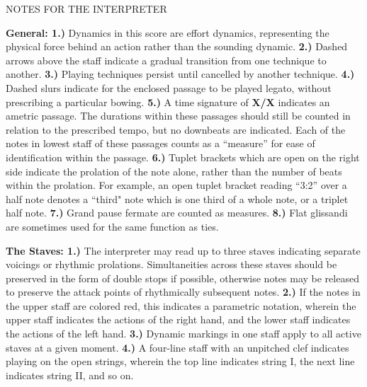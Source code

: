 \documentclass[10pt]{article}
\begin{document}
\begingroup
\begin{center}
\huge NOTES FOR THE INTERPRETER
\end{center}
\endgroup

\begingroup
\begin{center}
\huge 
\end{center}
\endgroup


\begingroup
\textbf{General: 1.)} Dynamics in this score are effort dynamics, representing the physical force behind an action rather than the sounding dynamic. \textbf{2.)} Dashed arrows above the staff indicate a gradual transition from one technique to another. \textbf{3.)} Playing techniques persist until cancelled by another technique. \textbf{4.)} Dashed slurs indicate for the enclosed passage to be played legato, without prescribing a particular bowing. \textbf{5.)} A time signature of \textbf{X/X} indicates an ametric passage. The durations within these passages should still be counted in relation to the prescribed tempo, but no downbeats are indicated. Each of the notes in lowest staff of these passages counts as a ``measure'' for ease of identification within the passage. \textbf{6.)} Tuplet brackets which are open on the right side indicate the prolation of the note alone, rather than the number of beats within the prolation. For example, an open tuplet bracket reading ``3:2'' over a half note denotes a ``third" note which is one third of a whole note, or a triplet half note. \textbf{7.)} Grand pause fermate are counted as measures. \textbf{8.)} Flat glissandi are sometimes used for the same function as ties. \\
\endgroup 

\begingroup
\textbf{The Staves: 1.)} The interpreter may read up to three staves indicating separate voicings or rhythmic prolations. Simultaneities across these staves should be preserved in the form of double stops if possible, otherwise notes may be released to preserve the attack points of rhythmically subsequent notes. \textbf{2.)} If the notes in the upper staff are colored red, this indicates a parametric notation, wherein the upper staff indicates the actions of the right hand, and the lower staff indicates the actions of the left hand. \textbf{3.)} Dynamic markings in one staff apply to all active staves at a given moment.  \textbf{4.)} A four-line staff with an unpitched clef indicates playing on the open strings, wherein the top line indicates string I, the next line indicates string II, and so on. \\
\endgroup
\end{document}
